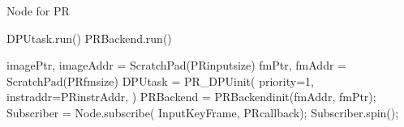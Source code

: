 \begin{algorithm}[h]
    \caption{ Node for PR }
    \begin{algorithmic}[1]
        \State DPUtask.run()
        \State PRBackend.run()
        \EndFunction

        \State imagePtr, imageAddr = ScratchPad(PRinputsize)
        \State fmPtr, fmAddr = ScratchPad(PRfmsize)
        \State DPUtask = PR\_DPUinit( {\color{red} priority=1},{\color{blue} instraddr=PRinstrAddr}, 
        \State \qquad \qquad \qquad {} ) 
        \State PRBackend = PRBackendinit({\color{blue}fmAddr, fmPtr});
        \State Subscriber = Node.subscribe( InputKeyFrame, PRcallback);
        \State Subscriber.spin();
        \EndFunction
    \end{algorithmic}
\end{algorithm}
